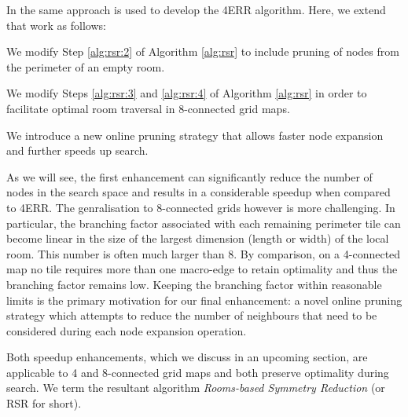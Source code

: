 In \cite{harabor10} the same approach is used to develop the 4ERR algorithm.
Here, we extend that work as follows:
\begin{enumerate}
\item{
We modify Step \ref{alg:rsr:2} of Algorithm \ref{alg:rsr} 
to include pruning of nodes from the perimeter of an empty room.
}
\item{
We modify Steps \ref{alg:rsr:3} and \ref{alg:rsr:4} of Algorithm
\ref{alg:rsr} in order to facilitate optimal room traversal in 8-connected grid
maps. 
\item{We introduce a new online pruning strategy that allows faster node
expansion and further speeds up search.}
}
\end{enumerate}
As we will see, the first enhancement can significantly reduce the number of nodes
in the search space and results in a considerable speedup when compared to 4ERR.
The genralisation to 8-connected grids however is more challenging.
In particular, the branching factor associated with each remaining perimeter tile 
can become linear in the size of the largest dimension (length or width) of the local room. 
This number is often much larger than 8. 
By comparison, on a 4-connected map no tile requires more than one macro-edge 
to retain optimality and thus the branching factor remains low. 
Keeping the branching factor within reasonable limits is the primary motivation
for our final enhancement: a novel online pruning strategy which attempts to
reduce the number of neighbours that need to be considered during each node 
expansion operation.
\par
Both speedup enhancements, which we discuss in an upcoming section,
are applicable to 4 and 8-connected grid maps and both preserve optimality
during search.
We term the resultant algorithm \emph{Rooms-based Symmetry Reduction} 
(or RSR for short).
